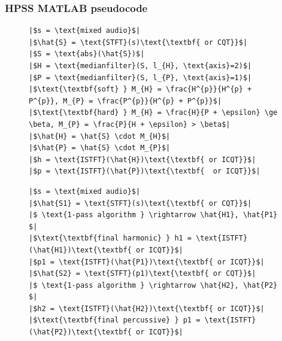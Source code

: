 \documentclass{beamer}
\newlength{\mintednumbersep}
\begin{document}
\begin{frame}[fragile]
	\frametitle{HPSS MATLAB pseudocode}
\begin{figure}[h]
  \centering
 \begin{minipage}{0.48\textwidth}
  \centering
\begin{verbatim}
|$s = \text{mixed audio}$|
|$\hat{S} = \text{STFT}(s)\text{\textbf{ or CQT}}$|
|$S = \text{abs}(\hat{S})$|
|$H = \text{medianfilter}(S, l_{H}, \text{axis}=2)$|
|$P = \text{medianfilter}(S, l_{P}, \text{axis}=1)$|
|$\text{\textbf{soft} } M_{H} = \frac{H^{p}}{H^{p} + P^{p}}, M_{P} = \frac{P^{p}}{H^{p} + P^{p}}$|
|$\text{\textbf{hard} } M_{H} = \frac{H}{P + \epsilon} \ge \beta, M_{P} = \frac{P}{H + \epsilon} > \beta$|
|$\hat{H} = \hat{S} \cdot M_{H}$|
|$\hat{P} = \hat{S} \cdot M_{P}$|
|$h = \text{ISTFT}(\hat{H})\text{\textbf{ or ICQT}}$|
|$p = \text{ISTFT}(\hat{P})\text{\textbf{  or ICQT}}$|
\end{verbatim}
 \end{minipage}
\hspace{0.02\textwidth}
 \begin{minipage}{0.48\textwidth}
  \centering
\begin{verbatim}
|$s = \text{mixed audio}$|
|$\hat{S1} = \text{STFT}(s)\text{\textbf{ or CQT}}$|
|$ \text{1-pass algorithm } \rightarrow \hat{H1}, \hat{P1} $|
|$\text{\textbf{final harmonic} } h1 = \text{ISTFT}(\hat{H1})\text{\textbf{ or ICQT}}$|
|$p1 = \text{ISTFT}(\hat{P1})\text{\textbf{ or ICQT}}$|
|$\hat{S2} = \text{STFT}(p1)\text{\textbf{ or CQT}}$|
|$ \text{1-pass algorithm } \rightarrow \hat{H2}, \hat{P2} $|
|$h2 = \text{ISTFT}(\hat{H2})\text{\textbf{ or ICQT}}$|
|$\text{\textbf{final percussive} } p1 = \text{ISTFT}(\hat{P2})\text{\textbf{ or ICQT}}$|
\end{verbatim}
 \end{minipage}
\end{figure}
\end{frame}
\end{document}

